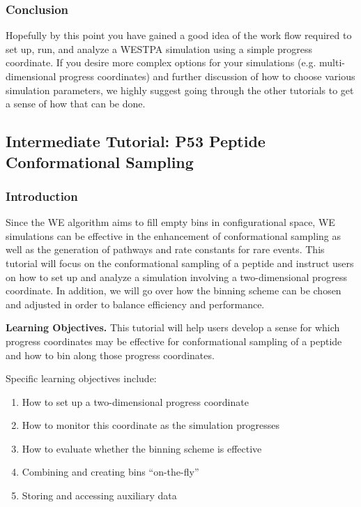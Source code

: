 \documentclass[9pt,tutorial,pubversion]{livecoms}
\begin{document}
\subsubsection{Conclusion}

Hopefully by this point you have gained a good idea of the work flow required to set up, run, and analyze a WESTPA simulation using a simple progress coordinate. 
If you desire more complex options for your simulations (e.g. multi-dimensional progress coordinates) and further discussion of how to choose various simulation parameters, we highly suggest going through the other tutorials to get a sense of how that can be done.

\subsection{Intermediate Tutorial: P53 Peptide Conformational Sampling}

\subsubsection{Introduction}

Since the WE algorithm aims to fill empty bins in configurational space, WE simulations can be effective in the enhancement of conformational sampling \citep{Dickson2014,Zwier2015} as well as the generation of pathways and rate constants for rare events. 
This tutorial will focus on the conformational sampling of a peptide and instruct users on how to set up and analyze a simulation involving a two-dimensional progress coordinate. 
In addition, we will go over how the binning scheme can be chosen and adjusted in order to balance efficiency and performance.

\textbf{Learning Objectives.} This tutorial will help users develop a sense for which progress coordinates may be effective for conformational sampling of a peptide and how to bin along those progress coordinates.  

Specific learning objectives include:
\begin{enumerate}
\item How to set up a two-dimensional progress coordinate
\item How to monitor this coordinate as the simulation progresses
\item How to evaluate whether the binning scheme is effective
\item Combining and creating bins “on-the-fly”
\item Storing and accessing auxiliary data
\end{enumerate}
\end{document}

